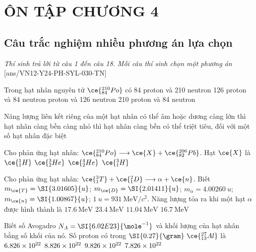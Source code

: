 \section{ÔN TẬP CHƯƠNG 4}
\subsection{Câu trắc nghiệm nhiều phương án lựa chọn}
\textit{Thí sinh trả lời từ câu 1 đến câu 18. Mỗi câu thí sinh chọn một phương án}
\setcounter{ex}{0}
[ans/VN12-Y24-PH-SYL-030-TN]
\begin{ex}
	Trong hạt nhân nguyên tử $\ce{^{210}_{84}Po}$ có
	\choice
	{84 proton và 210 neutron}
	{126 proton và 84 neutron}
	{ proton và 126 neutron}
	{210 proton và 84 neutron}
	\loigiai{}
\end{ex}
\begin{ex}
	Năng lượng liên kết riêng của một hạt nhân
	\choice
	{có thể âm hoặc dương}
	{\True càng lớn thì hạt nhân càng bền}
	{càng nhỏ thì hạt nhân càng bền}
	{có thể triệt tiêu, đối với một số hạt nhân đặc biệt}
	\loigiai{}
\end{ex}
\begin{ex}
	Cho phản ứng hạt nhân: $\ce{^{210}_{84}Po}\longrightarrow\ce{X}+\ce{^{206}_{82}Pb}$. Hạt $\ce{X}$ là
	\choice
	{$\ce{^1_1H}$}
	{$\ce{^3_2He}$}
	{\True $\ce{^4_2He}$}
	{$\ce{^3_1H}$}
	\loigiai{}
\end{ex}
\begin{ex}
	Cho phản ứng hạt nhân: $\ce{^3_1T}+\ce{^2_1D}\longrightarrow\alpha+\ce{n}$. Biết $m_{\ce{T}}=\SI{3.01605}{u}$; $m_{\ce{D}}=\SI{2.01411}{u}$; $m_{\alpha}=\SI{4.00260}{u}$; $m_{\ce{n}}=\SI{1.00867}{u}$; $\SI{1}{u}=\SI{931}{\mega\electronvolt/c^2}$. Năng lượng tỏa ra khi một hạt $\alpha$ được hình thành là
	\choice
	{\True $\SI{17.6}{\mega\electronvolt}$}
	{$\SI{23.4}{\mega\electronvolt}$}
	{$\SI{11.04}{\mega\electronvolt}$}
	{$\SI{16.7}{\mega\electronvolt}$}
	\loigiai{}
\end{ex}
\begin{ex}
	Biết số Avogadro $N_A=\SI{6.02E23}{\mole^{-1}}$ và khối lượng của hạt nhân bằng số khối của nó. Số proton có trong $\SI{0.27}{\gram}\ \ce{^{27}_{13}Al}$ là
	\choice
	{$\SI{6.826E22}{}$}
	{$\SI{8.826E22}{}$}
	{$\SI{9.826E22}{}$}
	{\True $\SI{7.826E22}{}$}
	\loigiai{}
\end{ex}
